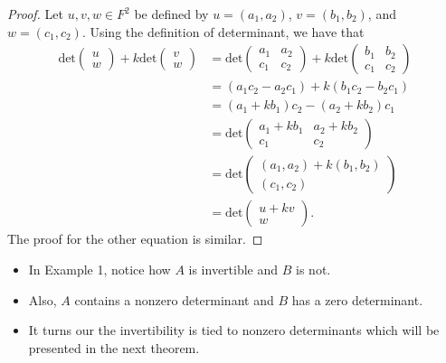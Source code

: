 \begin{proof}
 Let \( u,v,w \in F^{2} \) be defined by \( u = ({a}_{1}, {a}_{2}) \), \( v  = ({b}_{1}, {b}_{2}) \), and \( w = ({c}_{1}, {c}_{2}) \). Using the definition of determinant, we have that
 \begin{align*}
     \text{det} \begin{pmatrix}
         u \\
         w 
     \end{pmatrix}  + k \text{det} \begin{pmatrix}
         v \\ 
         w 
     \end{pmatrix} &=  \text{det} \begin{pmatrix}
     {a}_{1} & {a}_{2} \\
     {c}_{1} & {c}_{2} 
     \end{pmatrix} + k \text{det} \begin{pmatrix}
     {b}_{1} & {b}_{2} \\
     {c}_{1} & {c}_{2} 
     \end{pmatrix}  \\
     &= ({a}_{1}{c}_{2} -  {a}_{2} {c}_{1}) + k ({b}_{1} {c}_{2} - {b}_{2} {c}_{1}) \\
     &=  ({a}_{1} + k {b}_{1}) {c}_{2} - ({a}_{2} + {kb}_{2}) {c}_{1} \\
     &=  \text{det} \begin{pmatrix}
         {a}_{1} + {kb}_{1} & {a}_{2} + {kb}_{2} \\
         {c}_{1} & {c}_{2}
     \end{pmatrix} \\ &= \text{det} \begin{pmatrix}
        ({a}_{1}, {a}_{2}) + k({b}_{1},{b}_{2}) \\ 
        ({c}_{1}, {c}_{2})
     \end{pmatrix}  \\
     &= \text{det} \begin{pmatrix}
         u + kv \\
         w 
     \end{pmatrix}.
 \end{align*}
 The proof for the other equation is similar.
\end{proof}

\begin{itemize}
    \item In Example 1, notice how \( A  \) is invertible and \( B  \) is not. 
    \item Also, \( A  \) contains a nonzero determinant and \( B  \) has a zero determinant.
    \item It turns our the invertibility is tied to nonzero determinants which will be presented in the next theorem.
\end{itemize}

